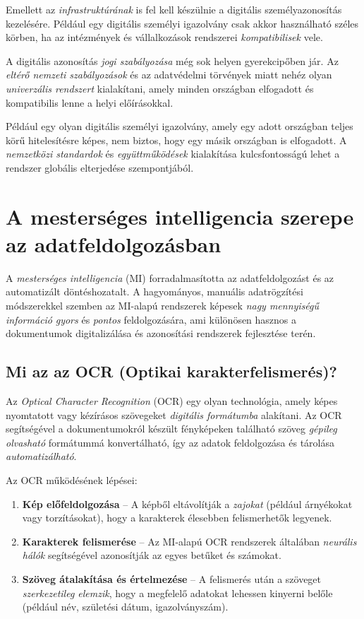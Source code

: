 \documentclass[
]{thesis-ekf}
\theoremstyle{definition}
\theoremstyle{remark}
\begin{document}
	Emellett az \emph{infrastruktúrának} is fel kell készülnie a digitális személyazonosítás kezelésére. Például egy digitális személyi igazolvány csak akkor használható széles körben, ha az intézmények és vállalkozások rendszerei \emph{kompatibilisek} vele.
	
	A digitális azonosítás \emph{jogi szabályozása} még sok helyen gyerekcipőben jár. Az \emph{eltérő nemzeti szabályozások} és az adatvédelmi törvények miatt nehéz olyan \emph{univerzális rendszert} kialakítani, amely minden országban elfogadott és kompatibilis lenne a helyi előírásokkal.
	
	Például egy olyan digitális személyi igazolvány, amely egy adott országban teljes körű hitelesítésre képes, nem biztos, hogy egy másik országban is elfogadott. A \emph{nemzetközi standardok} és \emph{együttműködések} kialakítása kulcsfontosságú lehet a rendszer globális elterjedése szempontjából.
	
	\chapter{A mesterséges intelligencia szerepe az adatfeldolgozásban}
	A \emph{mesterséges intelligencia} (MI) forradalmasította az adatfeldolgozást és az automatizált döntéshozatalt. A hagyományos, manuális adatrögzítési módszerekkel szemben az MI-alapú rendszerek képesek \emph{nagy mennyiségű információ} \emph{gyors} és \emph{pontos} feldolgozására, ami különösen hasznos a dokumentumok digitalizálása és azonosítási rendszerek fejlesztése terén.
	
	\section{Mi az az OCR (Optikai karakterfelismerés)?}
	Az \emph{Optical Character Recognition} (OCR) egy olyan technológia, amely képes nyomtatott vagy kézírásos szövegeket \emph{digitális formátumba} alakítani. Az OCR segítségével a dokumentumokról készült fényképeken található szöveg \emph{gépileg olvasható} formátummá konvertálható, így az adatok feldolgozása és tárolása \emph{automatizálható}.
	
	Az OCR működésének lépései: \begin{enumerate} \item \textbf{Kép előfeldolgozása} -- A képből eltávolítják a \emph{zajokat} (például árnyékokat vagy torzításokat), hogy a karakterek élesebben felismerhetők legyenek. \item \textbf{Karakterek felismerése} -- Az MI-alapú OCR rendszerek általában \emph{neurális hálók} segítségével azonosítják az egyes betűket és számokat. \item \textbf{Szöveg átalakítása és értelmezése} -- A felismerés után a szöveget \emph{szerkezetileg elemzik}, hogy a megfelelő adatokat lehessen kinyerni belőle (például név, születési dátum, igazolványszám). \end{enumerate}
	
\end{document}
